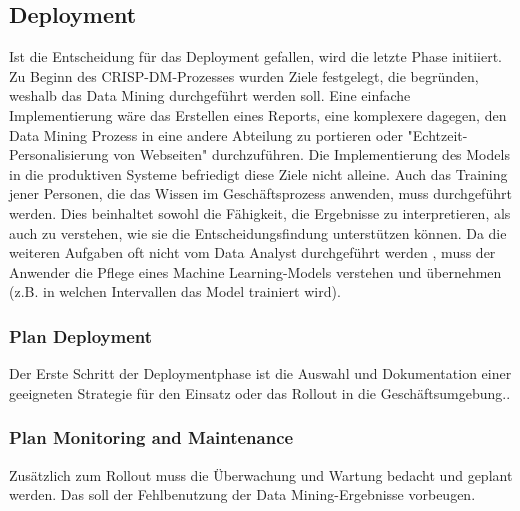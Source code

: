 \subsection{Deployment}
Ist die Entscheidung für das Deployment gefallen, wird die letzte Phase initiiert. Zu Beginn des CRISP-DM-Prozesses wurden Ziele festgelegt, die begründen, weshalb das Data Mining durchgeführt werden soll. 
Eine einfache Implementierung wäre das Erstellen eines Reports, eine komplexere dagegen, den Data Mining Prozess in eine andere Abteilung zu portieren\citep[Punkte 1.4.1.6.b und c]{larose_discovering_2014} oder "Echtzeit-Personalisierung von Webseiten"\citep[S.~18; eigene Übersetzung]{shearer_crisp-dm_2000} durchzuführen.\newline
Die Implementierung des Models in die produktiven Systeme befriedigt diese Ziele nicht alleine. Auch das Training jener Personen, die das Wissen im Geschäftsprozess anwenden, muss durchgeführt werden. Dies beinhaltet sowohl die Fähigkeit, die Ergebnisse zu interpretieren, als auch zu verstehen, wie sie die Entscheidungsfindung unterstützen können.\citep[S.~73]{swamynathan_mastering_2017} \newline
Da die weiteren Aufgaben oft nicht vom Data Analyst durchgeführt werden \citep[Punkt 1.4.1.6.d]{larose_discovering_2014}, muss der Anwender die Pflege eines Machine Learning-Models verstehen und übernehmen (z.B. in welchen Intervallen das Model trainiert wird).\citep[S.~74]{swamynathan_mastering_2017}

\subsubsection{Plan Deployment}
Der Erste Schritt der Deploymentphase ist die Auswahl und Dokumentation einer geeigneten Strategie für den Einsatz oder das Rollout in die Geschäftsumgebung..

\subsubsection{Plan Monitoring and Maintenance}
Zusätzlich zum Rollout muss die Überwachung und Wartung bedacht und geplant werden. Das soll der Fehlbenutzung der Data Mining-Ergebnisse vorbeugen.

